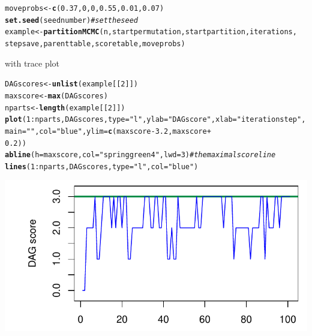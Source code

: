 \documentclass[a4paper]{article}\usepackage[]{graphicx}\usepackage[]{color}
\makeatletter
\def\maxwidth{ %
  \ifdim\Gin@nat@width>\linewidth
    \linewidth
  \else
    \Gin@nat@width
  \fi
}
\newcommand{\hlnum}[1]{\textcolor[rgb]{0.686,0.059,0.569}{#1}}%
\newcommand{\hlstr}[1]{\textcolor[rgb]{0.192,0.494,0.8}{#1}}%
\newcommand{\hlcom}[1]{\textcolor[rgb]{0.678,0.584,0.686}{\textit{#1}}}%
\newcommand{\hlopt}[1]{\textcolor[rgb]{0,0,0}{#1}}%
\newcommand{\hlstd}[1]{\textcolor[rgb]{0.345,0.345,0.345}{#1}}%
\newcommand{\hlkwb}[1]{\textcolor[rgb]{0.69,0.353,0.396}{#1}}%
\newcommand{\hlkwc}[1]{\textcolor[rgb]{0.333,0.667,0.333}{#1}}%
\newcommand{\hlkwd}[1]{\textcolor[rgb]{0.737,0.353,0.396}{\textbf{#1}}}%
\newenvironment{kframe}{%
 \def\at@end@of@kframe{}%
 \ifinner\ifhmode%
  \def\at@end@of@kframe{\end{minipage}}%
  \begin{minipage}{\columnwidth}%
 \fi\fi%
 \def\FrameCommand##1{\hskip\@totalleftmargin \hskip-\fboxsep
 \colorbox{shadecolor}{##1}\hskip-\fboxsep
     \hskip-\linewidth \hskip-\@totalleftmargin \hskip\columnwidth}%
 \MakeFramed {\advance\hsize-\width
   \@totalleftmargin\z@ \linewidth\hsize
   \@setminipage}}%
 {\par\unskip\endMakeFramed%
 \at@end@of@kframe}
\newenvironment{knitrout}{}{} %
\newcommand{\nn}{\noindent}
\makeatother
\begin{document}
\begin{knitrout}
\color{fgcolor}\begin{kframe}
\begin{alltt}
\hlstd{moveprobs} \hlkwb{<-} \hlkwd{c}\hlstd{(}\hlnum{0.37}\hlstd{,} \hlnum{0}\hlstd{,} \hlnum{0}\hlstd{,} \hlnum{0.55}\hlstd{,} \hlnum{0.01}\hlstd{,} \hlnum{0.07}\hlstd{)}
\hlkwd{set.seed}\hlstd{(seednumber)}  \hlcom{# set the seed}
\hlstd{example} \hlkwb{<-} \hlkwd{partitionMCMC}\hlstd{(n, startpermutation, startpartition, iterations,}
    \hlstd{stepsave, parenttable, scoretable, moveprobs)}
\end{alltt}
\end{kframe}
\end{knitrout}

\nn with trace plot

\begin{knitrout}
\color{fgcolor}\begin{kframe}
\begin{alltt}
\hlstd{DAGscores} \hlkwb{<-} \hlkwd{unlist}\hlstd{(example[[}\hlnum{2}\hlstd{]])}
\hlstd{maxscore} \hlkwb{<-} \hlkwd{max}\hlstd{(DAGscores)}
\hlstd{nparts} \hlkwb{<-} \hlkwd{length}\hlstd{(example[[}\hlnum{2}\hlstd{]])}
\hlkwd{plot}\hlstd{(}\hlnum{1}\hlopt{:}\hlstd{nparts, DAGscores,} \hlkwc{type} \hlstd{=} \hlstr{"l"}\hlstd{,} \hlkwc{ylab} \hlstd{=} \hlstr{"DAG score"}\hlstd{,} \hlkwc{xlab} \hlstd{=} \hlstr{"iteration step"}\hlstd{,}
    \hlkwc{main} \hlstd{=} \hlstr{""}\hlstd{,} \hlkwc{col} \hlstd{=} \hlstr{"blue"}\hlstd{,} \hlkwc{ylim} \hlstd{=} \hlkwd{c}\hlstd{(maxscore} \hlopt{-} \hlnum{3.2}\hlstd{, maxscore} \hlopt{+}
        \hlnum{0.2}\hlstd{))}
\hlkwd{abline}\hlstd{(}\hlkwc{h} \hlstd{= maxscore,} \hlkwc{col} \hlstd{=} \hlstr{"springgreen4"}\hlstd{,} \hlkwc{lwd} \hlstd{=} \hlnum{3}\hlstd{)}  \hlcom{# the maximal score line}
\hlkwd{lines}\hlstd{(}\hlnum{1}\hlopt{:}\hlstd{nparts, DAGscores,} \hlkwc{type} \hlstd{=} \hlstr{"l"}\hlstd{,} \hlkwc{col} \hlstd{=} \hlstr{"blue"}\hlstd{)}
\end{alltt}
\end{kframe}

{\centering \includegraphics[width=\maxwidth]{figure/minimal-unnamed-chunk-23-1} 

}



\end{knitrout}
\end{document}
